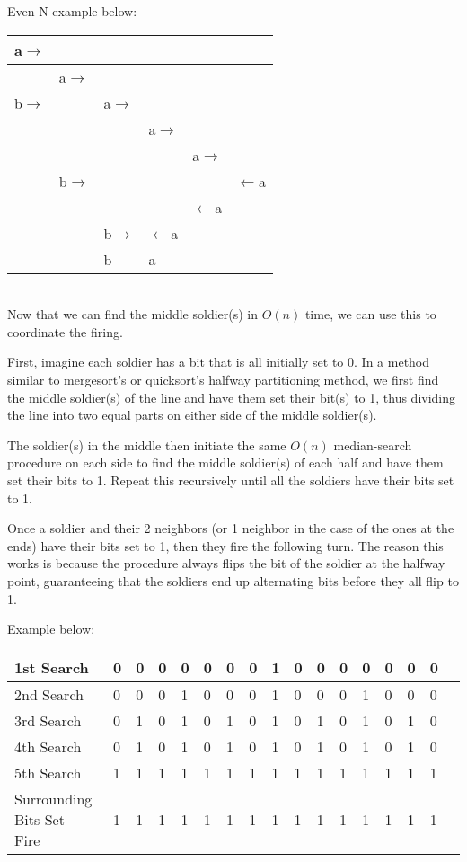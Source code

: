 \documentclass[11pt]{article}
\begin{document}
Even-N example below:\\

\begin{tabular}{|l|l|l|l|l|l|}
    \hline
        a$\rightarrow$&&&&&\\
    \hline
        &a$\rightarrow$&&&&\\
    \hline
        b$\rightarrow$&&a$\rightarrow$&&&\\
    \hline
        &&&a$\rightarrow$&&\\
    \hline
        &&&&a$\rightarrow$&\\
    \hline
        &b$\rightarrow$&&&&$\leftarrow$a\\
    \hline
        &&&&$\leftarrow$a&\\
    \hline
        &&b$\rightarrow$&$\leftarrow$a&&\\
    \hline
        &&b&a&&\\
    \hline
\end{tabular}\\

Now that we can find the middle soldier(s) in $O(n)$ time, we can use this to coordinate the firing.

First, imagine each soldier has a bit that is all initially set to 0. In a method similar to mergesort's or quicksort's halfway partitioning method, we first find the middle soldier(s) of the line and have them set their bit(s) to 1, thus dividing the line into two equal parts on either side of the middle soldier(s).

The soldier(s) in the middle then initiate the same $O(n)$ median-search procedure on each side to find the middle soldier(s) of each half and have them set their bits to 1. Repeat this recursively until all the soldiers have their bits set to 1.

Once a soldier and their 2 neighbors (or 1 neighbor in the case of the ones at the ends) have their bits set to 1, then they fire the following turn. The reason this works is because the procedure always flips the bit of the soldier at the halfway point, guaranteeing that the soldiers end up alternating bits before they all flip to 1.

Example below:\\

\begin{tabular}{|l|l|l|l|l|l|l|l|l|l|l|l|l|l|l|l|l|}
    \hline
        1st Search&0&0&0&0&0&0&0&1&0&0&0&0&0&0&0\\
    \hline
        2nd Search&0&0&0&1&0&0&0&1&0&0&0&1&0&0&0\\
    \hline
        3rd Search&0&1&0&1&0&1&0&1&0&1&0&1&0&1&0\\
    \hline
        4th Search&0&1&0&1&0&1&0&1&0&1&0&1&0&1&0\\
    \hline
        5th Search&1&1&1&1&1&1&1&1&1&1&1&1&1&1&1\\
    \hline
        Surrounding Bits Set - Fire&1&1&1&1&1&1&1&1&1&1&1&1&1&1&1\\
    \hline
\end{tabular}\\
\end{document}

